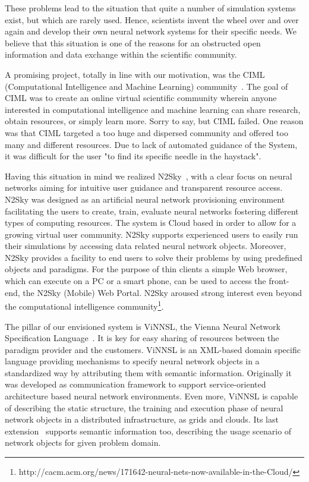 \documentclass[conference]{IEEEtran}
\begin{document}
These problems lead to the situation that quite a number of simulation systems exist, but which are rarely
used. Hence, scientists invent the wheel over and over again and develop their own neural network systems for their specific
needs. We believe that this situation is one of the reasons for an obstructed open information and data exchange within the scientific community.

A promising project, totally in line with our motivation, was the CIML (Computational Intelligence and Machine Learning) community~\cite{zurada2009building}. The goal of CIML was to create an online virtual scientific community wherein anyone interested in computational intelligence and machine learning can share research, obtain resources, or simply learn more. Sorry to say, but CIML failed. One reason was that CIML targeted a too huge and dispersed community and offered too many and different resources. Due to lack of automated guidance of the System, it was difficult for the user "to find its specific needle in the haystack".

Having this situation in mind we realized N2Sky~\cite{N2Sky}, with a clear focus on neural networks aiming for intuitive user guidance and transparent resource access.
N2Sky was designed as an artificial neural network provisioning environment facilitating the users to create, train, evaluate neural networks fostering different types of computing resources. The system is Cloud based in order to allow for a growing virtual user community.
N2Sky supports experienced users to easily run their simulations by accessing data related neural network objects. Moreover, N2Sky provides a facility to end users to solve their problems by using predefined objects and paradigms. For the purpose of thin clients a simple Web browser, which can execute on a PC or a smart phone, can be used to access the front-end, the N2Sky (Mobile) Web Portal. %
N2Sky aroused strong interest even beyond the computational intelligence community\footnote{http://cacm.acm.org/news/171642-neural-nets-now-available-in-the-Cloud/}.

The pillar of our envisioned system is ViNNSL, the Vienna Neural Network Specification Language~\cite{Beran2008}. It is key for easy sharing of resources between the paradigm provider and the customers. ViNNSL is an XML-based domain specific language providing mechanisms to specify neural network objects in a standardized way by attributing them with semantic information. Originally it was developed as communication framework to support service-oriented architecture based neural network environments. Even more, ViNNSL is capable of describing the static structure, the training and execution phase of neural network objects in a distributed infrastructure, as grids and clouds.
Its last extension~\cite{ijcnn15} supports semantic information too, describing the usage scenario of network objects for given problem domain.
\end{document}
